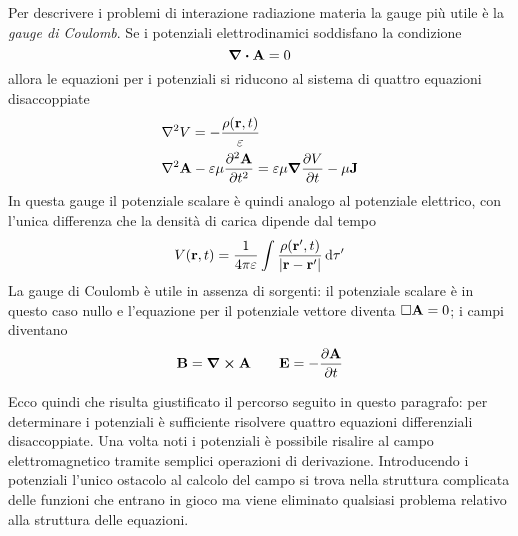 

Per descrivere i problemi di interazione radiazione materia la gauge più utile è la \textit{gauge di Coulomb}.
Se i potenziali elettrodinamici soddisfano la condizione
    \begin{equation}
        \div{\vb{A}}=0
    \end{equation}
    allora le equazioni per i potenziali si riducono al sistema di quattro equazioni disaccoppiate
    \begin{equation}
        \begin{split}
            &\laplacian{V}=-\frac{\rho(\vb{r},t)}{\epsilon}\\
            &\laplacian{\vb{A}}-\epsilon\mu \pdv[2]{\vb{A}}{t}=\epsilon\mu \grad\pdv{V}{t}-\mu \vb{J}
        \end{split}
    \end{equation}
In questa gauge il potenziale scalare è quindi analogo al potenziale elettrico, con l'unica differenza che la densità di carica
dipende dal tempo
\[
    V(\vb{r},t)=\frac{1}{4\pi\varepsilon}\int\frac{\rho(\vb{r}',t)}{\abs{\vb{r}-\vb{r'}}}\dd{\tau'}
\]
La gauge di Coulomb è utile in assenza di sorgenti: il potenziale scalare è in questo caso nullo e l'equazione
per il potenziale vettore diventa $\square \vb{A}=0$; i campi diventano
\[
    \vb{B}=\curl{\vb{A}}\quad\quad \vb{E}=-\pdv{\vb{A}}{t}
\]


Ecco quindi che risulta giustificato il percorso seguito in questo paragrafo: per determinare i potenziali è sufficiente risolvere quattro
equazioni differenziali disaccoppiate. Una volta noti i potenziali è possibile risalire al campo elettromagnetico tramite semplici
operazioni di derivazione. Introducendo i potenziali l'unico ostacolo al calcolo del campo si trova nella struttura complicata delle
funzioni che entrano in gioco ma viene eliminato qualsiasi problema relativo alla struttura delle equazioni.
